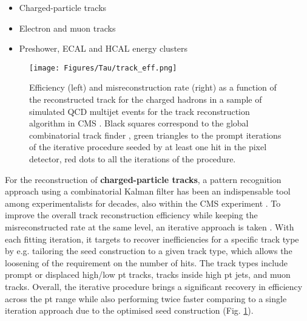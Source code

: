 \begin{itemize}
    \item Charged-particle tracks
    \item Electron and muon tracks
    \item Preshower, ECAL and HCAL energy clusters
\end{itemize}

\begin{figure}[ht!]
    \centering
    \texttt{[image: Figures/Tau/track\_eff.png]}
    \caption{Efficiency (left) and misreconstruction rate (right) as a function of the reconstructed track \pt for the charged hadrons in a sample of simulated QCD multijet events for the track reconstruction algorithm in CMS \cite{CMS:2017yfk}. Black squares correspond to the global combinatorial track finder \cite{CMS:2006myw}, green triangles to the prompt iterations of the iterative procedure \cite{CMS:2014pgm} seeded by at least one hit in the pixel detector, red dots to all the iterations of the procedure.}
    \label{fig:track_eff}
\end{figure}

For the reconstruction of \textbf{charged-particle tracks}, a pattern recognition approach using a combinatorial Kalman filter has been an indispensable tool among experimentalists for decades, also within the CMS experiment \cite{Adam:2005cg}. To improve the overall track reconstruction efficiency while keeping the misreconstructed rate at the same level, an iterative approach is taken \cite{CMS:2014pgm}. With each fitting iteration, it targets to recover inefficiencies for a specific track type by e.g. tailoring the seed construction to a given track type, which allows the loosening of the requirement on the number of hits. The track types include prompt or displaced high/low pt tracks, tracks inside high pt jets, and muon tracks. Overall, the iterative procedure brings a significant recovery in efficiency across the pt range while also performing twice faster comparing to a single iteration approach due to the optimised seed construction (Fig. \ref{fig:track_eff}).



